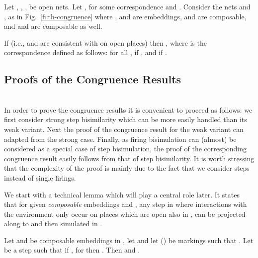 \documentclass{LMCS}
\begin{document}
\begin{thm}
  \label{th:congruence}
  Let , , ,  be open nets.
Let , for some correspondence  and
  . Consider the nets  and , as in
  Fig.~\ref{fi:th-congruence} where ,  and  are
  embeddings,  and  are composable, and  and  are
  composable as well.

  If  (i.e.,  and  are
  consistent with  on open places) then , where  is the
  correspondence defined as follows:
  for all ,  if , and   if .
\end{thm}




\subsection{Proofs of the Congruence Results}
\ \\

\noindent
In order to prove the congruence results it is convenient to proceed
as follows: we first consider strong step bisimilarity which can be
more easily handled than its weak variant.  Next the proof of the
congruence result for the weak variant can adapted from the strong
case. Finally, as firing bisimulation can (almost) be considered as a
special case of step bisimulation, the proof of the corresponding
congruence result easily follows from that of step bisimilarity. It is
worth stressing that the complexity of the proof is mainly due to the
fact that we consider steps instead of single firings. 

We start with a technical lemma which will play a central role 
later.
It states that for given \emph{composable}
embeddings  and , any step in
 where interactions with the environment only occur on places
which are open also in , can be projected along 
to  and then simulated in .

\begin{lem}
  \label{le:move-step}
  Let  and  be composable
  embeddings in , let  and let
   () be markings such that
  .  Let  be a
  step such that if , for  then
  . Then  and .
\end{lem}
\end{document}
